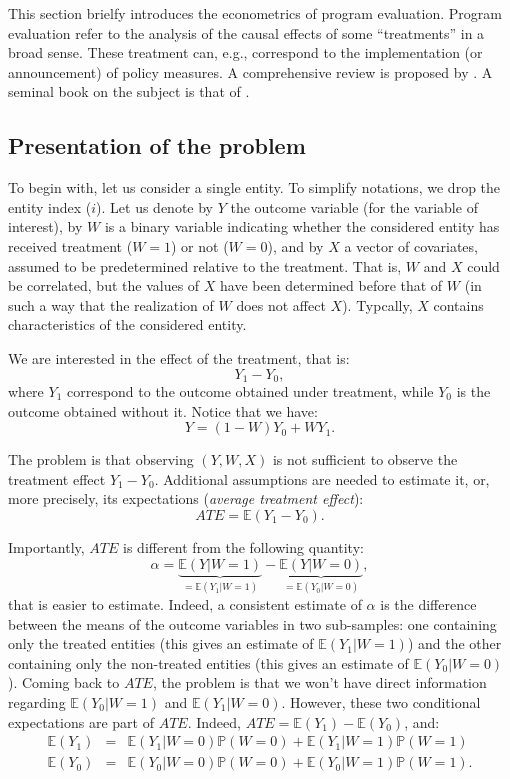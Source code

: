 \documentclass[
  12pt,
]{book}
\theoremstyle{definition}
\theoremstyle{definition}
\theoremstyle{definition}
\theoremstyle{definition}
\theoremstyle{remark}
\begin{document}
This section brielfy introduces the econometrics of program evaluation. Program evaluation refer to the analysis of the causal effects of some ``treatments'' in a broad sense. These treatment can, e.g., correspond to the implementation (or announcement) of policy measures. A comprehensive review is proposed by \citet{Abadie_Cattaneo_2018}. A seminal book on the subject is that of \citet{angrist_mostly_2008}.

\hypertarget{presentation-of-the-problem}{%
\subsection{Presentation of the problem}\label{presentation-of-the-problem}}

To begin with, let us consider a single entity. To simplify notations, we drop the entity index (\(i\)). Let us denote by \(Y\) the outcome variable (for the variable of interest), by \(W\) is a binary variable indicating whether the considered entity has received treatment (\(W=1\)) or not (\(W=0\)), and by \(X\) a vector of covariates, assumed to be predetermined relative to the treatment. That is, \(W\) and \(X\) could be correlated, but the values of \(X\) have been determined before that of \(W\) (in such a way that the realization of \(W\) does not affect \(X\)). Typcally, \(X\) contains characteristics of the considered entity.

We are interested in the effect of the treatment, that is:
\[
Y_1 - Y_0,
\]
where \(Y_1\) correspond to the outcome obtained under treatment, while \(Y_0\) is the outcome obtained without it. Notice that we have:
\[
Y = (1-W) Y_0 + W Y_1.
\]

The problem is that observing \((Y,W,X)\) is not sufficient to observe the treatment effect \(Y_1 - Y_0\). Additional assumptions are needed to estimate it, or, more precisely, its expectations (\emph{average treatment effect}):
\[
ATE = \mathbb{E}(Y_1 - Y_0).
\]

Importantly, \(ATE\) is different from the following quantity:
\[
\alpha = \underbrace{\mathbb{E}(Y|W=1)}_{=\mathbb{E}(Y_1|W=1)} - \underbrace{\mathbb{E}(Y|W=0)}_{=\mathbb{E}(Y_0|W=0)},
\]
that is easier to estimate. Indeed, a consistent estimate of \(\alpha\) is the difference between the means of the outcome variables in two sub-samples: one containing only the treated entities (this gives an estimate of \(\mathbb{E}(Y_1|W=1)\)) and the other containing only the non-treated entities (this gives an estimate of \(\mathbb{E}(Y_0|W=0)\)). Coming back to \(ATE\), the problem is that we won't have direct information regarding \(\mathbb{E}(Y_0|W=1)\) and \(\mathbb{E}(Y_1|W=0)\). However, these two conditional expectations are part of \(ATE\). Indeed, \(ATE = \mathbb{E}(Y_1) - \mathbb{E}(Y_0)\), and:
\begin{eqnarray}
\mathbb{E}(Y_1) &=& \mathbb{E}(Y_1|W=0)\mathbb{P}(W=0)+\mathbb{E}(Y_1|W=1)\mathbb{P}(W=1) \label{eq:EY1a} \\
\mathbb{E}(Y_0) &=& \mathbb{E}(Y_0|W=0)\mathbb{P}(W=0)+\mathbb{E}(Y_0|W=1)\mathbb{P}(W=1). \label{eq:EY0a}
\end{eqnarray}
\end{document}
